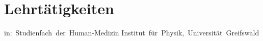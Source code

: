 \documentclass[11pt,a4paper]{moderncv}
\begin{document}
    \section{Lehrtätigkeiten}
        {in:~Studienfach~der~Human-Medizin\newline}{}%
        {Institut~für~Physik,~Universität~Greifswald}{}

\end{document}
